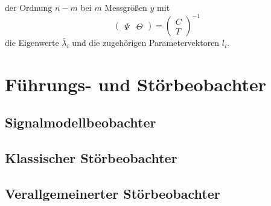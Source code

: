 der Ordnung $n-m$ bei $m$ Messgrößen $y$ mit
\begin{equation}
    \begin{pmatrix} \Psi & \Theta \end{pmatrix} =
    {\begin{pmatrix} C \\ T \end{pmatrix}}^{-1}
\end{equation}
die Eigenwerte $\bar{\lambda}_i$ und die zugehörigen Parametervektoren $l_i$. 

\section{Führungs- und Störbeobachter}
\subsection{Signalmodellbeobachter}

\subsection{Klassischer Störbeobachter}

\subsection{Verallgemeinerter Störbeobachter}
